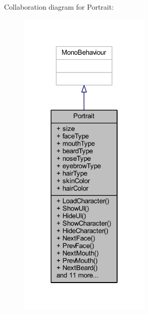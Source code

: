 Collaboration diagram for Portrait\+:
\nopagebreak
\begin{figure}[H]
\begin{center}
\leavevmode
\includegraphics[width=178pt]{class_portrait__coll__graph}
\end{center}
\end{figure}
